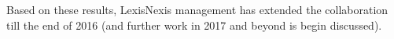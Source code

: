 \documentclass{sig-alternate-05-2015}
\begin{document}
Based on  these results, LexisNexis management has extended the collaboration till the end of 2016 (and further work in 2017
and beyond is begin discussed).









 

%
 \renewcommand{\baselinestretch}{0.9}

\small

\balance
\renewcommand{\baselinestretch}{1}

%
%
\end{document}
